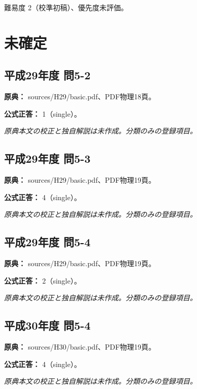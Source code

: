 \par 難易度 2（校準初稿）、優先度未評価。

\section{未確定}

\subsection{平成29年度 問5-2}
\label{q:h29-reg-basic-5-2}

\noindent\textbf{原典：} sources/H29/basic.pdf、PDF物理18頁。

\textbf{公式正答：} 1（single）。

\par\textit{原典本文の校正と独自解説は未作成。分類のみの登録項目。}

\subsection{平成29年度 問5-3}
\label{q:h29-reg-basic-5-3}

\noindent\textbf{原典：} sources/H29/basic.pdf、PDF物理19頁。

\textbf{公式正答：} 4（single）。

\par\textit{原典本文の校正と独自解説は未作成。分類のみの登録項目。}

\subsection{平成29年度 問5-4}
\label{q:h29-reg-basic-5-4}

\noindent\textbf{原典：} sources/H29/basic.pdf、PDF物理19頁。

\textbf{公式正答：} 2（single）。

\par\textit{原典本文の校正と独自解説は未作成。分類のみの登録項目。}

\subsection{平成30年度 問5-4}
\label{q:h30-reg-basic-5-4}

\noindent\textbf{原典：} sources/H30/basic.pdf、PDF物理19頁。

\textbf{公式正答：} 4（single）。

\par\textit{原典本文の校正と独自解説は未作成。分類のみの登録項目。}

